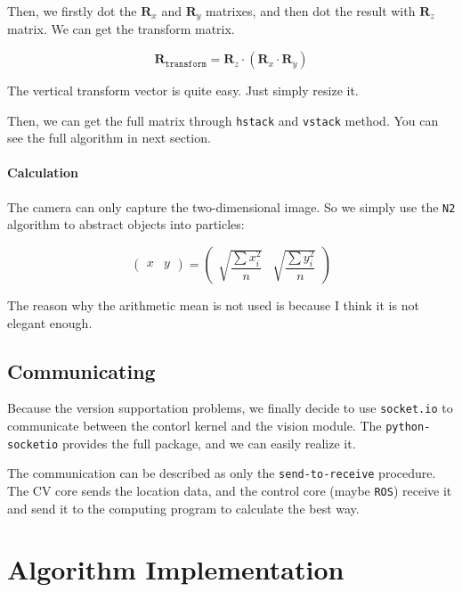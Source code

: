 \documentclass{article}
\begin{document}
Then, we firstly dot the $\boldsymbol{R}_x$ and $\boldsymbol{R}_y$ matrixes, and then dot the result with $\boldsymbol{R}_z$ matrix. We can get the transform matrix.

\begin{equation}
  \boldsymbol{R}_{\texttt{transform}}=\boldsymbol{R}_z\cdot\left(\boldsymbol{R}_x\cdot\boldsymbol{R}_y\right)
\end{equation}

The vertical transform vector is quite easy. Just simply resize it.

Then, we can get the full matrix through \texttt{hstack} and \texttt{vstack} method. You can see the full algorithm in next section.

\paragraph{Calculation}

The camera can only capture the two-dimensional image. So we simply use the \texttt{N2} algorithm to abstract objects into particles:

\[
  \left(\begin{matrix}x&y\end{matrix}\right)=\left(\begin{matrix}\sqrt{\dfrac{\sum x_i^2}{n}}&\sqrt{\dfrac{\sum y_i^2}{n}}\end{matrix}\right)
\]

The reason why the arithmetic mean is not used is because I think it is not elegant enough.

\subsection{Communicating}

Because the version supportation problems, we finally decide to use \texttt{socket.io} to communicate between the contorl kernel and the vision module. The \texttt{python-socketio} provides the full package, and we can easily realize it.

The communication can be described as only the \texttt{send-to-receive} procedure. The CV core sends the location data, and the control core (maybe \texttt{ROS}) receive it and send it to the computing program to calculate the best way.

\section{Algorithm Implementation}
\end{document}
